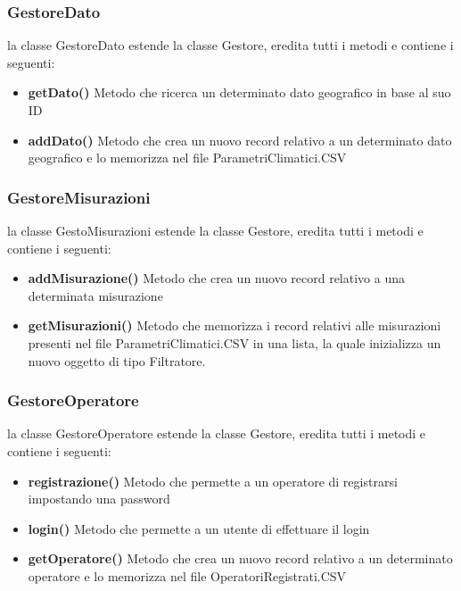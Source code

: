 \documentclass[a4paper, 12pt,twoside]{article}
\begin{document}
			
			\subsubsection{GestoreDato}
			la classe GestoreDato estende la classe Gestore, eredita tutti i metodi e contiene i seguenti:
			\begin{itemize}
				\item \textbf{getDato()}
				Metodo che ricerca un determinato dato geografico in base al suo ID
				\item \textbf {addDato()}
				Metodo che crea un nuovo record relativo a un determinato dato geografico e lo memorizza nel file ParametriClimatici.CSV
			\end{itemize}
			
			
			\subsubsection{GestoreMisurazioni}
			la classe GestoMisurazioni estende la classe Gestore, eredita tutti i metodi e contiene i seguenti:
			\begin{itemize}
				\item \textbf{addMisurazione()}
				Metodo che crea un nuovo record relativo a una determinata misurazione
				\item \textbf {getMisurazioni()}
				Metodo che memorizza i record relativi alle misurazioni presenti nel file ParametriClimatici.CSV in una lista, la quale inizializza un nuovo oggetto di tipo Filtratore.
			\end{itemize}
			
			
			\subsubsection{GestoreOperatore}
			la classe GestoreOperatore estende la classe Gestore, eredita tutti i metodi e contiene i seguenti:
			\begin{itemize}
				\item \textbf{registrazione()}
				Metodo che permette a un operatore di registrarsi impostando una password
				\item \textbf{login()}
				Metodo che permette a un utente di effettuare il login
				\item \textbf{getOperatore()}
				Metodo che crea un nuovo record relativo a un determinato operatore e lo memorizza nel file OperatoriRegistrati.CSV
			\end{itemize}
			
		
			
\end{document}
